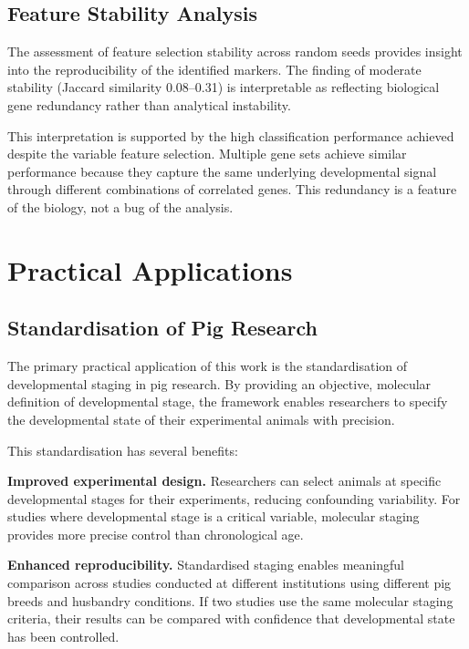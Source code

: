 \subsection{Feature Stability Analysis}

The assessment of feature selection stability across random seeds provides insight into the reproducibility of the identified markers. The finding of moderate stability (Jaccard similarity 0.08--0.31) is interpretable as reflecting biological gene redundancy rather than analytical instability.

This interpretation is supported by the high classification performance achieved despite the variable feature selection. Multiple gene sets achieve similar performance because they capture the same underlying developmental signal through different combinations of correlated genes. This redundancy is a feature of the biology, not a bug of the analysis.


\section{Practical Applications}\label{sec:discussion:applications}

\subsection{Standardisation of Pig Research}

The primary practical application of this work is the standardisation of developmental staging in pig research. By providing an objective, molecular definition of developmental stage, the framework enables researchers to specify the developmental state of their experimental animals with precision.

This standardisation has several benefits:

\textbf{Improved experimental design.} Researchers can select animals at specific developmental stages for their experiments, reducing confounding variability. For studies where developmental stage is a critical variable, molecular staging provides more precise control than chronological age.

\textbf{Enhanced reproducibility.} Standardised staging enables meaningful comparison across studies conducted at different institutions using different pig breeds and husbandry conditions. If two studies use the same molecular staging criteria, their results can be compared with confidence that developmental state has been controlled.

